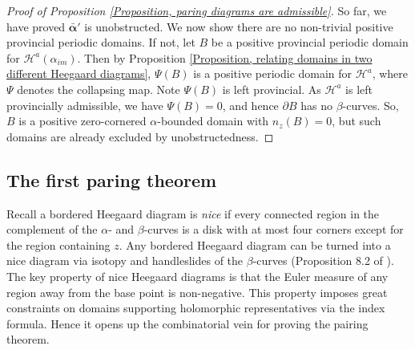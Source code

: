 \documentclass{amsart}
\theoremstyle{definition}
\theoremstyle{remark}
\numberwithin{equation}{section}
\numberwithin{equation}{section} \makeatletter
\begin{document}
\begin{proof}[Proof of Proposition \ref{Proposition, paring diagrams are admissible}]
So far, we have proved $\bar{\bm{\alpha}}'$ is unobstructed. We now show there are no non-trivial positive provincial periodic domains. If not, let $B$ be a positive provincial periodic domain for $\mathcal{H}^a(\alpha_{im})$. Then by Proposition \ref{Proposition, relating domains in two different Heegaard diagrams}, $\Psi(B)$ is a positive periodic domain for $\mathcal{H}^a$, where $\Psi$ denotes the collapsing map. Note $\Psi(B)$ is left provincial. As $\mathcal{H}^a$ is left provincially admissible, we have $\Psi(B)=0$, and hence $\partial B$ has no $\beta$-curves. So, $B$ is a positive zero-cornered $\alpha$-bounded domain with $n_z(B)=0$, but such domains are already excluded by unobstructedness. 
\end{proof}




\subsection{The first paring theorem}\label{Subsection, first pairing theorem}
Recall a bordered Heegaard diagram is \emph{nice} if every connected region in the complement of the $\alpha$- and $\beta$-curves is a disk with at most four corners except for the region containing $z$. Any bordered Heegaard diagram can be turned into a nice diagram via isotopy and handleslides of the $\beta$-curves (Proposition 8.2 of \cite{LOT18}). The key property of nice Heegaard diagrams is that the Euler measure of any region away from the base point is non-negative. This property imposes great constraints on domains supporting holomorphic representatives via the index formula. Hence it opens up the combinatorial vein for proving the pairing theorem.
\end{document}
